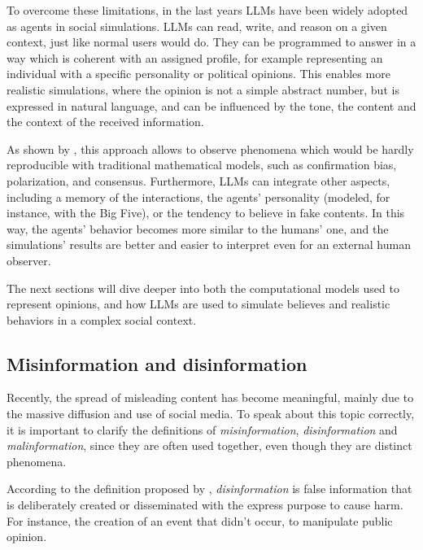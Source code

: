 \medskip
To overcome these limitations, in the last years LLMs have been widely adopted as agents in social simulations.
LLMs can read, write, and reason on a given context, just like normal users would do.
They can be programmed to answer in a way which is coherent with an assigned profile, for example representing an individual with a specific personality or political opinions.
This enables more realistic simulations, where the opinion is not a simple abstract number, but is expressed in natural language, and can be influenced by the tone, the content and the context of the received information.

\medskip
As shown by \citet{chuang2024simulatingopiniondynamicsnetworks, cau2025languagedrivenopiniondynamicsagentbased, piao2025emergencehumanlikepolarizationlarge}, this approach allows to observe phenomena which would be hardly reproducible with traditional mathematical models, such as confirmation bias, polarization, and consensus.
Furthermore, LLMs can integrate other aspects, including a memory of the interactions, the agents' personality (modeled, for instance, with the Big Five), or the tendency to believe in fake contents.
In this way, the agents' behavior becomes more similar to the humans' one, and the simulations' results are better and easier to interpret even for an external human observer.

\medskip
The next sections will dive deeper into both the computational models used to represent opinions, and how LLMs are used to simulate believes and realistic behaviors in a complex social context.





\subsection{Misinformation and disinformation} %
Recently, the spread of misleading content has become meaningful, mainly due to the massive diffusion and use of social media.
To speak about this topic correctly, it is important to clarify the definitions of \textit{misinformation}, \textit{disinformation} and \textit{malinformation}, since they are often used together, even though they are distinct phenomena.


According to the definition proposed by \citet{wardle2017information, wardle2017information}, \textit{disinformation} is false information that is deliberately created or disseminated with the express purpose to cause harm.
For instance, the creation of an event that didn't occur, to manipulate public opinion.

